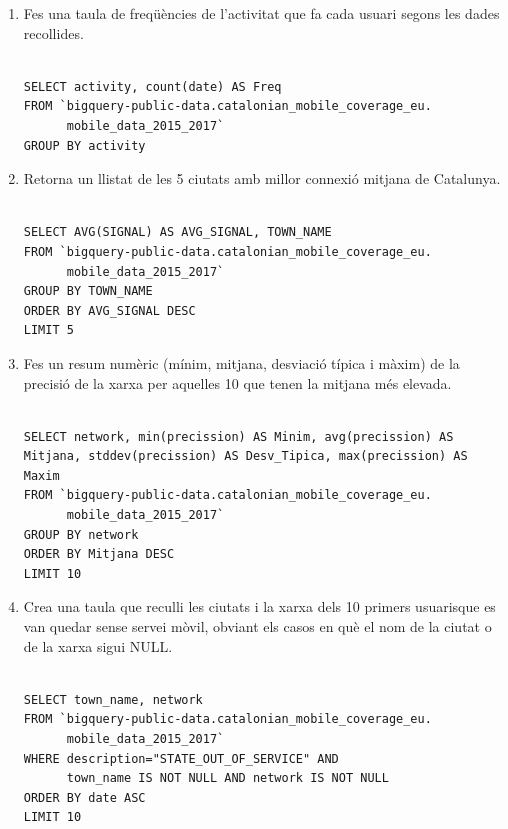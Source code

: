 \documentclass[11pt,longbibliography]{article}
\theoremstyle{definition}
\theoremstyle{remark}
\begin{document}
\begin{enumerate}

\item Fes una taula de freqüències de l'activitat que fa cada usuari segons les dades recollides.

\begin{Verbatim}[frame=single]

SELECT activity, count(date) AS Freq
FROM `bigquery-public-data.catalonian_mobile_coverage_eu.
      mobile_data_2015_2017`
GROUP BY activity

\end{Verbatim}

\item Retorna un llistat de les 5 ciutats amb millor connexió mitjana de Catalunya.

\begin{Verbatim}[frame=single]

SELECT AVG(SIGNAL) AS AVG_SIGNAL, TOWN_NAME
FROM `bigquery-public-data.catalonian_mobile_coverage_eu.
      mobile_data_2015_2017`
GROUP BY TOWN_NAME
ORDER BY AVG_SIGNAL DESC
LIMIT 5
\end{Verbatim}

\item Fes un resum numèric (mínim, mitjana, desviació típica i màxim) de la precisió de la xarxa per aquelles 10 que tenen la mitjana més elevada.

\begin{Verbatim}[frame=single]

SELECT network, min(precission) AS Minim, avg(precission) AS 
Mitjana, stddev(precission) AS Desv_Tipica, max(precission) AS 
Maxim
FROM `bigquery-public-data.catalonian_mobile_coverage_eu.
      mobile_data_2015_2017`
GROUP BY network
ORDER BY Mitjana DESC
LIMIT 10
\end{Verbatim}

\item Crea una taula que reculli les ciutats i la xarxa dels 10 primers usuarisque es van quedar sense servei mòvil, obviant els casos en què el nom de la ciutat o de la xarxa sigui NULL.

\begin{Verbatim}[frame=single]

SELECT town_name, network
FROM `bigquery-public-data.catalonian_mobile_coverage_eu.
      mobile_data_2015_2017`
WHERE description="STATE_OUT_OF_SERVICE" AND 
      town_name IS NOT NULL AND network IS NOT NULL
ORDER BY date ASC
LIMIT 10
\end{Verbatim}


\end{enumerate}
\end{document}
